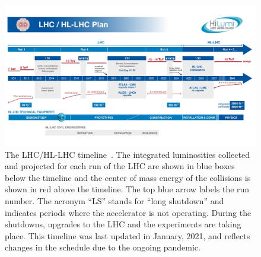 \begin{figure}[t]
    \centering
    \includegraphics[width = \textwidth]{figures/HL-LHC-updated-January-2021_small.jpg}
    \caption{The LHC/HL-LHC timeline~\cite{hl-lhc_plan_picture_website}. The integrated luminosities collected and projected for each run of the LHC are shown in blue boxes below the timeline and the center of mass energy of the collisions is shown in red above the timeline. The top blue arrow labels the run number. The acronym ``LS'' stands for ``long shutdown'' and indicates periods where the accelerator is not operating. During the shutdowns, upgrades to the LHC and the experiments are taking place. This timeline was last updated in January, 2021, and reflects changes in the schedule due to the ongoing pandemic. }
    \label{fig:hl-lhc}
\end{figure}



